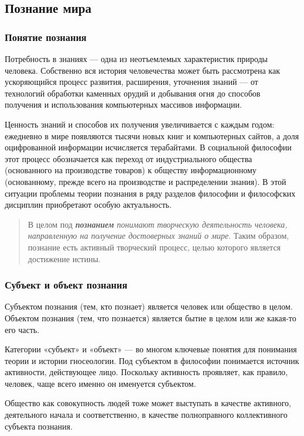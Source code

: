 \documentclass[a4paper, 14pt]{extreport}
\begin{document}
\subsection{Познание мира}

\subsubsection{Понятие познания}

Потребность в знаниях --- одна из неотъемлемых характеристик природы
человека. Собственно вся история человечества может быть рассмотрена как
ускоряющийся процесс развития, расширения, уточнения знаний --- от
технологий обработки каменных орудий и добывания огня до способов
получения и использования компьютерных массивов информации.

Ценность знаний и способов их получения увеличивается с каждым годом:
ежедневно в мире появляются тысячи новых книг и компьютерных сайтов, а
доля оцифрованной информации исчисляется терабайтами. В социальной
философии этот процесс обозначается как переход от индустриального
общества (основанного на производстве товаров) к обществу
информационному (основанному, прежде всего на производстве и
распределении знания). В этой ситуации проблемы теории познания в ряду
разделов философии и философских дисциплин приобретают особую
актуальность.

\begin{quote}
В целом под \emph{\textbf{познанием} понимают творческую деятельность
человека, направленную на получение достоверных знаний о мире}. Таким
образом, познание есть активный творческий процесс, целью которого
является достижение истины.
\end{quote}

\subsubsection{Субъект и объект познания}

Субъектом познания (тем, кто познает) является человек или общество в
целом. Объектом познания (тем, что познается) является бытие в целом или
же какая-то его часть.

Категории «субъект» и «объект» --- во многом ключевые понятия для
понимания теории и истории гносеологии. Под субъектом в философии
понимается источник активности, действующее лицо. Поскольку активность
проявляет, как правило, человек, чаще всего именно он именуется
субъектом.

Общество как совокупность людей тоже может выступать в качестве
активного, деятельного начала и соответственно, в качестве полноправного
коллективного субъекта познания.
\end{document}
